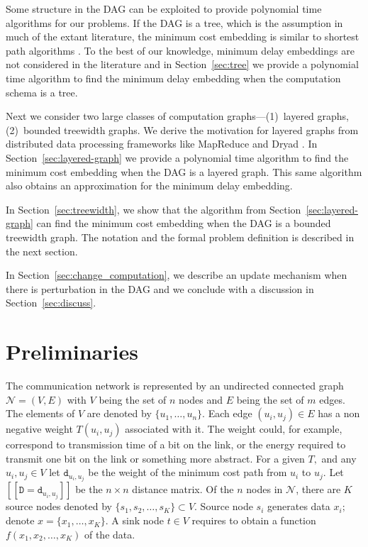 \documentclass[journal]{IEEEtran}
\newcommand{\net}{\mathcal{N}}
\newcommand{\netnodes}{V}
\newcommand{\netedges}{E}
\newcommand{\distance}{\mathtt{d}} \newcommand{\edgewt}{\mathtt{W}} \newcommand{\processingwt}{\mathtt{P}}
\begin{document}
Some structure in the DAG can be exploited to provide polynomial time
algorithms for our problems. If the DAG is a tree, which is the
assumption in much of the extant literature, the minimum cost
embedding is similar to shortest path algorithms
\cite{Ying08,Shah13}. To the best of our knowledge, minimum delay
embeddings are not considered in the literature and in
Section~\ref{sec:tree} we provide a polynomial time algorithm to find
the minimum delay embedding when the computation schema is a tree.

Next we consider two large classes of computation graphs---(1)~layered
graphs, (2)~bounded treewidth graphs. We derive the motivation for
layered graphs from distributed data processing frameworks like
MapReduce \cite{Dean04} and Dryad \cite{Isard07}.  In
Section~\ref{sec:layered-graph} we provide a polynomial time algorithm
to find the minimum cost embedding when the DAG is a layered
graph. This same algorithm also obtains an approximation for the
minimum delay embedding.

In Section~\ref{sec:treewidth}, we show that the algorithm from
Section~\ref{sec:layered-graph} can find the minimum cost embedding
when the DAG is a bounded treewidth graph.  
The notation and the
formal problem definition is described in the next section.

In Section~\ref{sec:change_computation}, we describe an update
mechanism when there is perturbation in the DAG and we conclude with a
discussion in Section~\ref{sec:discuss}.

\section{Preliminaries}
\label{sec:prelims}

The communication network is represented by an undirected connected
graph $\net = (\netnodes,\netedges)$ with $\netnodes$ being the set of
$n$ nodes and $\netedges$ being the set of $m$ edges. The elements of
$\netnodes$ are denoted by $\{u_1, \ldots, u_n\}.$ Each edge
$(u_i,u_j) \in \netedges$ has a non negative weight $T(u_i,u_j)$
associated with it. The weight could, for example, correspond to
transmission time of a bit on the link, or the energy required to
transmit one bit on the link or something more abstract.  For a given
$T,$ and any $u_i,u_j \in \netnodes$ let $\distance_{u_i,u_j}$ be the
weight of the minimum cost path from $u_i$ to $u_j.$ Let $[[\mathtt{D}
= \distance_{u_i,u_j}]]$ be the $n \times n$ distance matrix.  Of the
$n$ nodes in $\net$, there are $K$ source nodes denoted by $\{s_1,s_2,
\ldots,s_K\} \subset \netnodes.$ Source node $s_i$ generates data
$x_i;$ denote $x=\{x_1,\ldots,x_K\}.$ A sink node ${t} \in \netnodes$
requires to obtain a function $f(x_1,x_2, \ldots, x_K)$ of the data.
\end{document}
